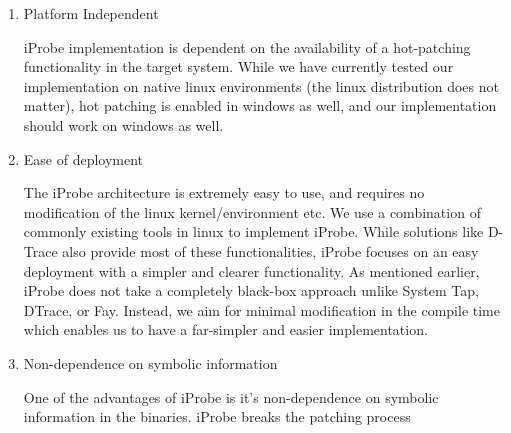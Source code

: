 \begin{enumerate}
  \item {Platform Independent}
  
  iProbe implementation is dependent on the availability of a hot-patching functionality in the target system.
  While we have currently tested our implementation on native linux environments (the linux distribution does not matter), hot patching is enabled in windows as well, and our implementation should work on windows as well.
  
  \item {Ease of deployment}
  
  The iProbe architecture is extremely easy to use, and requires no modification of the linux kernel/environment etc. We use a combination of commonly existing tools in linux to implement iProbe. While solutions like D-Trace also provide most of these functionalities, iProbe focuses on an easy deployment with a simpler and clearer functionality. As mentioned earlier, iProbe does not take a completely black-box approach unlike System Tap, DTrace, or Fay. Instead, we aim for minimal modification in the compile time which enables us to have a far-simpler and easier implementation.
  
 \item {Non-dependence on symbolic information}
 
One of the advantages of iProbe is it's non-dependence on symbolic information in the binaries. iProbe breaks the patching process

\end{enumerate}


